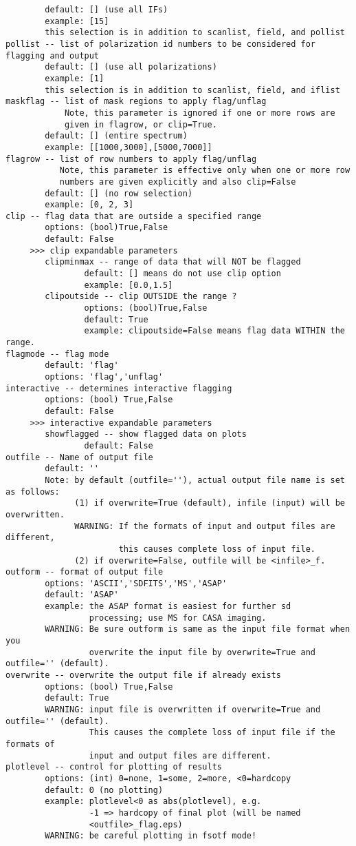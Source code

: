 \begin{verbatim}
        default: [] (use all IFs)
        example: [15]
        this selection is in addition to scanlist, field, and pollist
pollist -- list of polarization id numbers to be considered for flagging and output
        default: [] (use all polarizations)
        example: [1]
        this selection is in addition to scanlist, field, and iflist
maskflag -- list of mask regions to apply flag/unflag 
            Note, this parameter is ignored if one or more rows are 
            given in flagrow, or clip=True.
        default: [] (entire spectrum)
        example: [[1000,3000],[5000,7000]]
flagrow -- list of row numbers to apply flag/unflag
           Note, this parameter is effective only when one or more row 
           numbers are given explicitly and also clip=False
        default: [] (no row selection)
        example: [0, 2, 3]
clip -- flag data that are outside a specified range
        options: (bool)True,False
        default: False
     >>> clip expandable parameters
        clipminmax -- range of data that will NOT be flagged
                default: [] means do not use clip option
                example: [0.0,1.5]
        clipoutside -- clip OUTSIDE the range ?
                options: (bool)True,False
                default: True
                example: clipoutside=False means flag data WITHIN the range.
flagmode -- flag mode
        default: 'flag'
        options: 'flag','unflag'
interactive -- determines interactive flagging
        options: (bool) True,False
        default: False
     >>> interactive expandable parameters
        showflagged -- show flagged data on plots
                default: False
outfile -- Name of output file
        default: ''
        Note: by default (outfile=''), actual output file name is set as follows: 
              (1) if overwrite=True (default), infile (input) will be overwritten.
              WARNING: If the formats of input and output files are different, 
                       this causes complete loss of input file.
              (2) if overwrite=False, outfile will be <infile>_f. 
outform -- format of output file
        options: 'ASCII','SDFITS','MS','ASAP'
        default: 'ASAP'
        example: the ASAP format is easiest for further sd
                 processing; use MS for CASA imaging.
        WARNING: Be sure outform is same as the input file format when you 
                 overwrite the input file by overwrite=True and outfile='' (default).
overwrite -- overwrite the output file if already exists
        options: (bool) True,False
        default: True
        WARNING: input file is overwritten if overwrite=True and outfile='' (default). 
                 This causes the complete loss of input file if the formats of
                 input and output files are different.
plotlevel -- control for plotting of results
        options: (int) 0=none, 1=some, 2=more, <0=hardcopy
        default: 0 (no plotting)
        example: plotlevel<0 as abs(plotlevel), e.g.
                 -1 => hardcopy of final plot (will be named
                 <outfile>_flag.eps)
        WARNING: be careful plotting in fsotf mode!

\end{verbatim}


